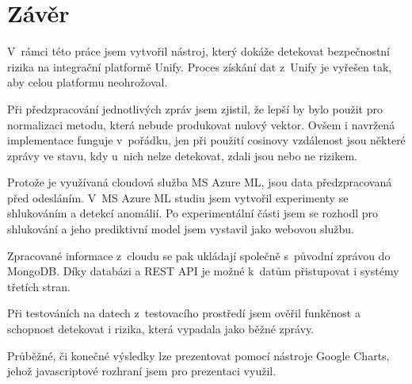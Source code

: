 \documentclass[thesis=M,czech]{FITthesis}[2012/10/20]
\begin{document}
\chapter{Závěr}
	V~rámci této práce jsem vytvořil nástroj, který dokáže detekovat bezpečnostní rizika na integrační platformě Unify. Proces získání dat z~Unify je vyřešen tak, aby celou platformu neohrožoval. 
	
	Při předzpracování jednotlivých zpráv jsem zjistil, že lepší by bylo použit pro normalizaci metodu, která nebude produkovat nulový vektor. Ovšem i navržená implementace funguje v~pořádku, jen při použití cosinovy vzdálenost jsou některé zprávy ve stavu, kdy u~nich nelze detekovat, zdali jsou nebo ne rizikem.
	
	Protože je využívaná cloudová služba MS Azure ML, jsou data předzpracovaná před odesláním. V~MS Azure ML studiu jsem vytvořil experimenty se shlukováním a detekcí anomálií. Po experimentální části jsem se rozhodl pro shlukování a jeho prediktivní model jsem vystavil jako webovou službu. 
	
	Zpracované informace z~cloudu se pak ukládají společně s~původní zprávou do MongoDB. Díky databázi a REST API je možné k~datům přistupovat i systémy třetích stran.
	
	Při testováních na datech z~testovacího prostředí jsem ověřil funkčnost a schopnost detekovat i rizika, která vypadala jako běžné zprávy.
	
	Průběžné, či konečné výsledky lze prezentovat pomocí nástroje Google Charts, jehož javascriptové rozhraní jsem pro prezentaci využil.  
	





\appendix
\end{document}
